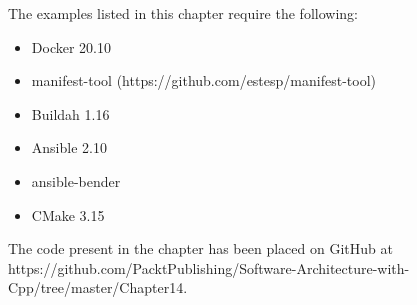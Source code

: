 The examples listed in this chapter require the following:


\begin{itemize}
\item 
Docker 20.10

\item 
manifest-tool (https://github.com/estesp/manifest-tool)

\item 
Buildah 1.16

\item 
Ansible 2.10

\item 
ansible-bender 

\item 
CMake 3.15
\end{itemize}

The code present in the chapter has been placed on GitHub at https://github.com/PacktPublishing/Software-Architecture-with-Cpp/tree/master/Chapter14.